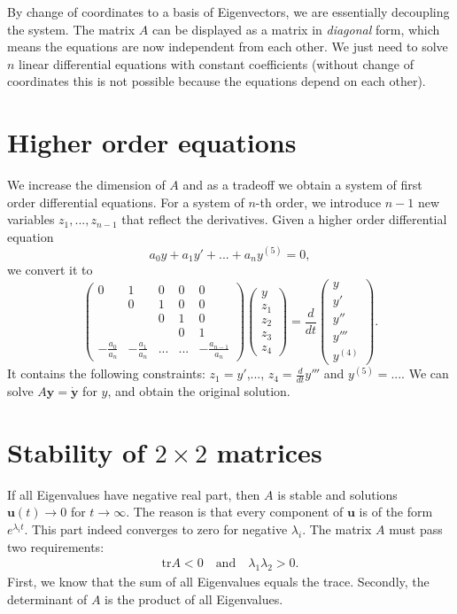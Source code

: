 \documentclass[a4paper, 11pt]{article}
\theoremstyle{plain}
\theoremstyle{definition}
\begin{document}
By change of coordinates to a basis of Eigenvectors, we are essentially decoupling the system. The matrix $A$ can be displayed as a matrix in \emph{diagonal} form, which means the equations are now independent from each other. We just need to solve $n$ linear differential equations with constant coefficients (without change of coordinates this is not possible because the equations depend on each other).

\section{Higher order equations}
We increase the dimension of $A$ and as a tradeoff we obtain a system of first order differential equations. For a system of $n$-th order, we introduce $n-1$ new variables $z_1, ..., z_{n-1}$ that reflect the derivatives. Given a higher order differential equation
\[
	a_0y + a_1y' + ... + a_ny^{(5)} = 0,
\]
we convert it to
\[
	\begin{pmatrix}
		0 & 1 & 0 & 0 & 0 \\
		& 0 & 1 & 0 &  0 \\
		 &  &  0 & 1 & 0 \\
		 		 &  &  & 0  & 1 \\
		-\frac{a_0}{a_n} & -\frac{a_1}{a_n} & ... &... & -\frac{a_{n-1}}{a_n}
	\end{pmatrix} \begin{pmatrix}
		y \\ z_1 \\ z_2 \\ z_3 \\ z_4
	\end{pmatrix} = \frac{d}{dt}\begin{pmatrix}
	y \\ y' \\ y'' \\ y''' \\ y^{(4)} 
	\end{pmatrix}.
\]
It contains the following constraints: $z_1 = y'$,..., $z_4 = \frac{d}{dt}y'''$ and $y^{(5)} = ...$. We can solve $A \mathbf y = \mathbf{\dot y}$ for $y$, and obtain the original solution.

\section{Stability of $2 \times 2$ matrices}
If all Eigenvalues have negative real part, then $A$ is stable and solutions $\mathbf u(t) \to 0$ for $t \to \infty$. The reason is that every component of $\mathbf u$ is of the form $e^{\lambda_i t}$. This part indeed converges to zero for negative $\lambda_i$. The matrix $A$ must pass two requirements:
\begin{gather*}
\mathrm{tr} A < 0 \quad \text{and} \quad \lambda_1\lambda_2 > 0.
\end{gather*}
First, we know that the sum of all Eigenvalues equals the trace. Secondly, the determinant of $A$ is the product of all Eigenvalues.
\end{document}
